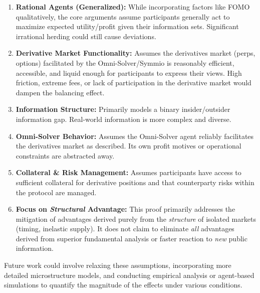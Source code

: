 \documentclass{article}
\begin{document}
\begin{enumerate}
    \item \textbf{Rational Agents (Generalized):} While incorporating factors like FOMO qualitatively, the core arguments assume participants generally act to maximize expected utility/profit given their information sets. Significant irrational herding could still cause deviations.
    \item \textbf{Derivative Market Functionality:} Assumes the derivatives market (perps, options) facilitated by the Omni-Solver/Symmio is reasonably efficient, accessible, and liquid enough for participants to express their views. High friction, extreme fees, or lack of participation in the derivative market would dampen the balancing effect.
    \item \textbf{Information Structure:} Primarily models a binary insider/outsider information gap. Real-world information is more complex and diverse.
    \item \textbf{Omni-Solver Behavior:} Assumes the Omni-Solver agent reliably facilitates the derivatives market as described. Its own profit motives or operational constraints are abstracted away.
    \item \textbf{Collateral & Risk Management:} Assumes participants have access to sufficient collateral for derivative positions and that counterparty risks within the protocol are managed.
    \item \textbf{Focus on \textit{Structural} Advantage:} This proof primarily addresses the mitigation of advantages derived purely from the \textit{structure} of isolated markets (timing, inelastic supply). It does not claim to eliminate \textit{all} advantages derived from superior fundamental analysis or faster reaction to \textit{new} public information.
\end{enumerate}
Future work could involve relaxing these assumptions, incorporating more detailed microstructure models, and conducting empirical analysis or agent-based simulations to quantify the magnitude of the effects under various conditions.
\end{document}
